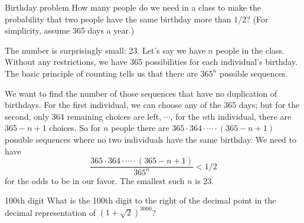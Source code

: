 \begin{problem}{Birthday problem}
How many people do we need in a class to make the probability that two people have the
same birthday more than $1/2$? (For simplicity, assume 365 days a year.)
\end{problem}

\begin{solution}
The number is surprisingly small: 23. Let's say we have $n$ people in the class. Without any
restrictions, we have 365 possibilities for each individual's birthday. The basic principle of
counting tells us that there are $365^n$ possible sequences.

We want to find the number of those sequences that have no duplication of birthdays. For the
first individual, we can choose any of the 365 days; but for the second, only 364 remaining
choices are left, $\cdots$, for the $n$th individual, there are $365-n+1$ choices. So for $n$
people there are $365\cdot364\cdot\cdots\cdot(365-n+1)$ possible sequences where no two
individuals have the same birthday. We need to have
\[
\frac{365\cdot364\cdot\cdots\cdot(365-n+1)}{365^n}<1/2
\]
for the odds to be in our favor. The smallest such $n$ is 23.

\end{solution}

\begin{problem}{100th digit}
What is the 100th digit to the right of the decimal point in the decimal representation of
$(1+\sqrt{2})^{3000}$?\footnotemark[10]
\end{problem}

